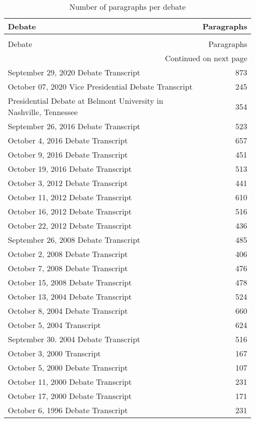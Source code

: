 \begin{longtable}{lr}
\caption{Number of paragraphs per debate} \label{tab:paragraphs_per_debate} \\
\toprule
Debate & Paragraphs \\
\midrule
\endfirsthead
\caption[]{Number of paragraphs per debate} \\
\toprule
Debate & Paragraphs \\
\midrule
\endhead
\midrule
\multicolumn{2}{r}{Continued on next page} \\
\midrule
\endfoot
\bottomrule
\endlastfoot
September 29, 2020 Debate Transcript & 873 \\
October 07, 2020 Vice Presidential Debate Transcript & 245 \\
Presidential Debate at Belmont University in Nashville, Tennessee & 354 \\
September 26, 2016 Debate Transcript & 523 \\
October 4, 2016 Debate Transcript & 657 \\
October 9, 2016 Debate Transcript & 451 \\
October 19, 2016 Debate Transcript & 513 \\
October 3, 2012 Debate Transcript & 441 \\
October 11, 2012 Debate Transcript & 610 \\
October 16, 2012 Debate Transcript & 516 \\
October 22, 2012 Debate Transcript & 436 \\
September 26, 2008 Debate Transcript & 485 \\
October 2, 2008 Debate Transcript & 406 \\
October 7, 2008 Debate Transcript & 476 \\
October 15, 2008 Debate Transcript & 478 \\
October 13, 2004 Debate Transcript & 524 \\
October 8, 2004 Debate Transcript & 660 \\
October 5, 2004 Transcript & 624 \\
September 30. 2004 Debate Transcript & 516 \\
October 3, 2000 Transcript & 167 \\
October 5, 2000 Debate Transcript & 107 \\
October 11, 2000 Debate Transcript & 231 \\
October 17, 2000 Debate Transcript & 171 \\
October 6, 1996 Debate Transcript & 231 \\

\end{longtable}
